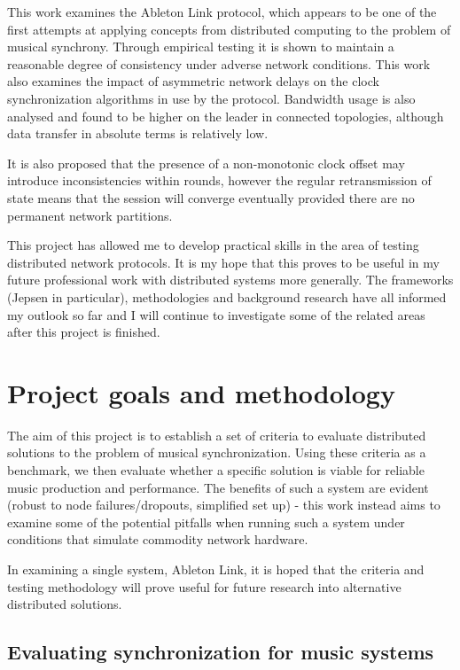 \documentclass[11pt]{article} %
\theoremstyle{plain}
\theoremstyle{definition}
\begin{document}
This work examines the Ableton Link\cite{goltz2018ableton} protocol, which
appears to be one of the first attempts at applying concepts from distributed
computing to the problem of musical synchrony. Through empirical testing it is
shown to maintain a reasonable degree of consistency under adverse network
conditions. This work also examines the impact of asymmetric network delays on
the clock synchronization algorithms in use by the protocol. Bandwidth usage is
also analysed and found to be higher on the leader in connected topologies,
although data transfer in absolute terms is relatively low.

It is also proposed that the presence of a non-monotonic clock offset may
introduce inconsistencies within rounds, however the regular retransmission of
state means that the session will converge eventually provided there are no
permanent network partitions.

This project has allowed me to develop practical skills in the area of testing
distributed network protocols. It is my hope that this proves to be useful in
my future professional work with distributed systems more generally. The
frameworks (Jepsen\cite{jepsen} in particular), methodologies and background
research have all informed my outlook so far and I will continue to investigate
some of the related areas after this project is finished.

\section{Project goals and methodology}

The aim of this project is to establish a set of criteria to evaluate
distributed solutions to the problem of musical synchronization. Using these
criteria as a benchmark, we then evaluate whether a specific solution is viable
for reliable music production and performance. The benefits of such a system
are evident (robust to node failures/dropouts, simplified set up) - this work
instead aims to examine some of the potential pitfalls when running such a
system under conditions that simulate commodity network hardware.

In examining a single system, Ableton Link, it is hoped that the criteria and
testing methodology will prove useful for future research into alternative
distributed solutions.

\subsection{Evaluating synchronization for music systems}
\end{document}
